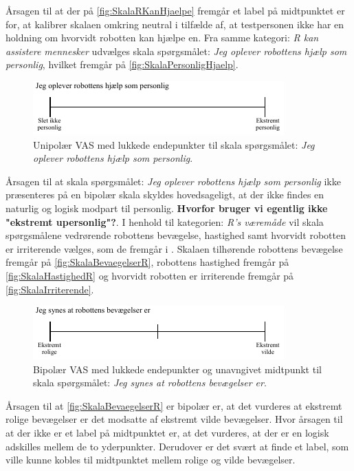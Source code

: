\noindent
%
Årsagen til at der på \autoref{fig:SkalaRKanHjaelpe} fremgår et label på midtpunktet er for, at kalibrer skalaen omkring neutral i tilfælde af, at testpersonen ikke har en holdning om hvorvidt robotten kan hjælpe en. Fra samme kategori: \textit{R kan assistere mennesker} udvælges skala spørgsmålet: \textit{Jeg oplever robottens hjælp som personlig}, hvilket fremgår på \autoref{fig:SkalaPersonligHjaelp}.
%
\begin{figure}[H]
\centering
\includegraphics[width =\textwidth]{Figure/UdvalgteSkalaer/PersonligHjaelp} 
\caption{Unipolær VAS med lukkede endepunkter til skala spørgsmålet: \textit{Jeg oplever robottens hjælp som personlig}.}
\label{fig:SkalaPersonligHjaelp}
\end{figure}
\noindent
%
Årsagen til at skala spørgsmålet: \textit{Jeg oplever robottens hjælp som personlig} ikke præsenteres på en bipolær skala skyldes hovedsageligt, at der ikke findes en naturlig og logisk modpart til personlig. \textbf{Hvorfor bruger vi egentlig ikke "ekstremt upersonlig"?}.\blankline
%
I henhold til kategorien: \textit{R's væremåde} vil skala spørgsmålene vedrørende robottens bevægelse, hastighed samt hvorvidt robotten er irriterende vælges, som de fremgår i . Skalaen tilhørende robottens bevægelse fremgår på \autoref{fig:SkalaBevaegelserR}, robottens hastighed fremgår på \autoref{fig:SkalaHastighedR} og hvorvidt robotten er irriterende fremgår på \autoref{fig:SkalaIrriterende}.  
%
\begin{figure}[H]
\centering
\includegraphics[width =\textwidth]{Figure/UdvalgteSkalaer/BevaegelserR} 
\caption{Bipolær VAS med lukkede endepunkter og unavngivet midtpunkt til skala spørgsmålet: \textit{Jeg synes at robottens bevægelser er}.}
\label{fig:SkalaBevaegelserR}
\end{figure}
\noindent
%
Årsagen til at \autoref{fig:SkalaBevaegelserR} er bipolær er, at det vurderes at ekstremt rolige bevægelser er det modsatte af ekstremt vilde bevægelser. Hvor årsagen til at der ikke er et label på midtpunktet er, at det vurderes, at der er en logisk adskilles mellem de to yderpunkter. Derudover er det svært at finde et label, som ville kunne kobles til midtpunktet mellem rolige og vilde bevægelser.
